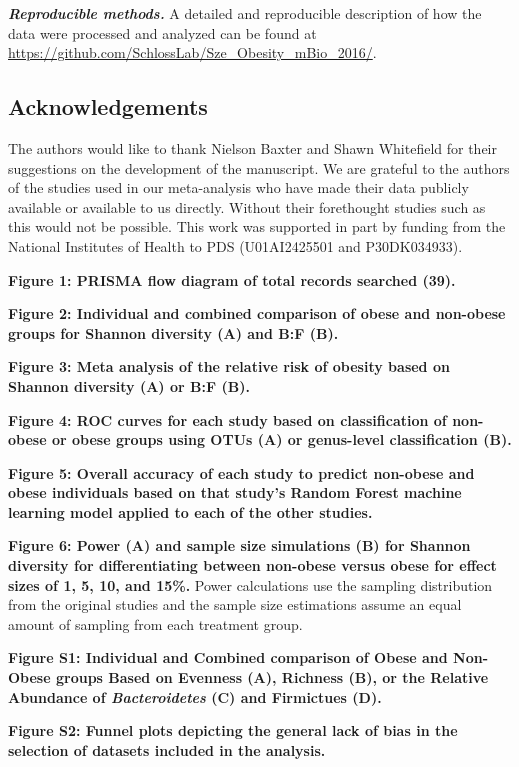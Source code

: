 \documentclass[12pt,]{article}
\begin{document}
\textbf{\emph{Reproducible methods.}} A detailed and reproducible
description of how the data were processed and analyzed can be found at
\url{https://github.com/SchlossLab/Sze_Obesity_mBio_2016/}.

\subsection{Acknowledgements}\label{acknowledgements}

The authors would like to thank Nielson Baxter and Shawn Whitefield for
their suggestions on the development of the manuscript. We are grateful
to the authors of the studies used in our meta-analysis who have made
their data publicly available or available to us directly. Without their
forethought studies such as this would not be possible. This work was
supported in part by funding from the National Institutes of Health to
PDS (U01AI2425501 and P30DK034933).

\newpage

\textbf{Figure 1: PRISMA flow diagram of total records searched (39).}

\textbf{Figure 2: Individual and combined comparison of obese and
non-obese groups for Shannon diversity (A) and B:F (B).}

\textbf{Figure 3: Meta analysis of the relative risk of obesity based on
Shannon diversity (A) or B:F (B).}

\textbf{Figure 4: ROC curves for each study based on classification of
non-obese or obese groups using OTUs (A) or genus-level classification
(B).}

\textbf{Figure 5: Overall accuracy of each study to predict non-obese
and obese individuals based on that study's Random Forest machine
learning model applied to each of the other studies.}

\textbf{Figure 6: Power (A) and sample size simulations (B) for Shannon
diversity for differentiating between non-obese versus obese for effect
sizes of 1, 5, 10, and 15\%.} Power calculations use the sampling
distribution from the original studies and the sample size estimations
assume an equal amount of sampling from each treatment group.

\newpage

\textbf{Figure S1: Individual and Combined comparison of Obese and
Non-Obese groups Based on Evenness (A), Richness (B), or the Relative
Abundance of \emph{Bacteroidetes} (C) and Firmictues (D).}

\textbf{Figure S2: Funnel plots depicting the general lack of bias in
the selection of datasets included in the analysis.}
\end{document}

